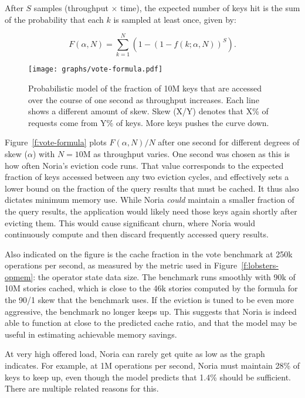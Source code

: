 After $S$ samples (throughput $\times$ time), the expected number of keys hit is
the sum of the probability that each $k$ is sampled at least once, given by:

\begin{displaymath}
  F(\alpha,N)={\sum \limits _{k=1}^{N} \left(1 - \left(1 - f(k; \alpha, N)\right)^{S}\right)}.
\end{displaymath}

\begin{figure}[h]
  \centering
  \texttt{[image: graphs/vote-formula.pdf]}
  \caption{Probabilistic model of the fraction of 10M keys that are accessed
  over the course of one second as throughput increases. Each line shows a
  different amount of skew. Skew (X/Y) denotes that X\% of requests come from
  Y\% of keys. More keys pushes the curve down.}
  \label{f:vote-formula}
\end{figure}

Figure~\vref{f:vote-formula} plots $F(\alpha, N)/N$ after one second for
different degrees of skew ($\alpha$) with $N=10\text{M}$ as throughput varies.
One second was chosen as this is how often Noria's eviction code runs. That
value corresponds to the expected fraction of keys accessed between any two
eviction cycles, and effectively sets a lower bound on the fraction of the query
results that must be cached. It thus also dictates minimum memory use. While
Noria \emph{could} maintain a smaller fraction of the query results, the
application would likely need those keys again shortly after evicting them. This
would cause significant churn, where Noria would continuously compute and then
discard frequently accessed query results.

Also indicated on the figure is the cache fraction in the vote benchmark at 250k
operations per second, as measured by the metric used in
Figure~\ref{f:lobsters-opmem}: the operator state data size. The benchmark runs
smoothly with 90k of 10M stories cached, which is close to the 46k stories
computed by the formula for the 90/1 skew that the benchmark uses. If the
eviction is tuned to be even more aggressive, the benchmark no longer keeps up.
This suggests that Noria is indeed able to function at close to the predicted
cache ratio, and that the model may be useful in estimating achievable memory
savings.

At very high offered load, Noria can rarely get quite as low as the graph
indicates. For example, at 1M operations per second, Noria must maintain 28\% of
keys to keep up, even though the model predicts that 1.4\% should be sufficient.
There are multiple related reasons for this.


